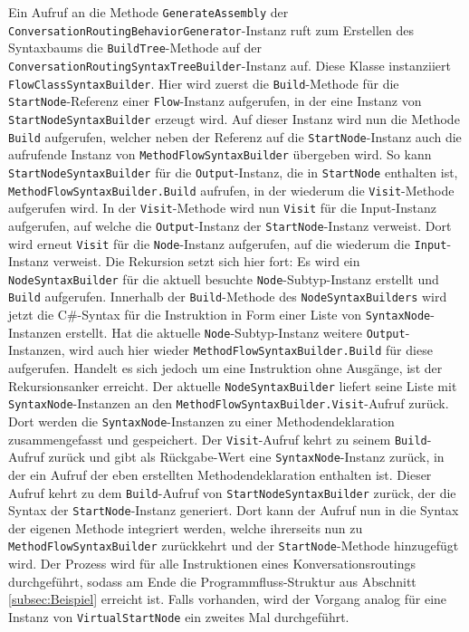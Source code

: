 \noindent Ein Aufruf an die Methode \texttt{GenerateAssembly} der \texttt{Con\-ver\-sa\-tion\-Rou\-ting\-Be\-ha\-vior\-Gen\-era\-tor}-Instanz ruft zum Erstellen des Syntaxbaums die \texttt{Build\-Tree}-Methode auf der \texttt{Con\-ver\-sa\-tion\-Rou\-ting\-Syn\-tax\-Tree\-Buil\-der}-Instanz auf. Diese Klasse instanziiert \texttt{Flow\-Class\-Syn\-tax\-Buil\-der}. Hier wird zuerst die \texttt{Build}-Methode für die \texttt{StartNode}-Referenz einer \texttt{Flow}-Instanz aufgerufen, in der eine Instanz von \texttt{StartNodeSyntaxBuilder} erzeugt wird. Auf dieser Instanz wird nun die Methode \texttt{Build} aufgerufen, welcher neben der Referenz auf die \texttt{StartNode}-Instanz auch die aufrufende Instanz von \texttt{Meth\-od\-Flow\-Syn\-tax\-Buil\-der} übergeben wird. So kann \texttt{StartNodeSyntaxBuilder} für die \texttt{Output}-Instanz, die in \texttt{StartNode} enthalten ist, \texttt{MethodFlowSyntaxBuilder.Build} aufrufen, in der wiederum die \texttt{Visit}-Methode aufgerufen wird. In der \texttt{Visit}-Methode wird nun \texttt{Visit} für die Input-Instanz aufgerufen, auf welche die \texttt{Output}-Instanz der \texttt{Start\-Node}-Instanz verweist. Dort wird erneut \texttt{Visit} für die \texttt{Node}-Instanz aufgerufen, auf die wiederum die \texttt{Input}-Instanz verweist. Die Rekursion setzt sich hier fort: Es wird ein \texttt{NodeSyntaxBuilder} für die aktuell besuchte \texttt{Node}-Subtyp-Instanz erstellt und \texttt{Build} aufgerufen. Innerhalb der \texttt{Build}-Methode des \texttt{NodeSyntaxBuilders} wird jetzt die C\#-Syntax für die Instruktion in Form einer Liste von \texttt{SyntaxNode}-Instanzen erstellt. Hat die aktuelle \texttt{Node}-Subtyp-Instanz weitere \texttt{Output}-Instanzen, wird auch hier wieder \texttt{Meth\-od\-Flow\-Syn\-tax\-Buil\-der.Build} für diese aufgerufen. Handelt es sich jedoch um eine Instruktion ohne Ausgänge, ist der Rekursionsanker erreicht. Der aktuelle \texttt{NodeSyntaxBuilder} liefert seine Liste mit \texttt{SyntaxNode}-Instanzen an den \texttt{Meth\-od\-Flow\-Syn\-tax\-Buil\-der.Visit}-Aufruf zurück. Dort werden die \texttt{SyntaxNode}-Instanzen zu einer Methodendeklaration zusammengefasst und gespeichert. Der \texttt{Visit}-Aufruf kehrt zu seinem \texttt{Build}-Aufruf zurück und gibt als Rückgabe-Wert eine \texttt{SyntaxNode}-Instanz zurück, in der ein Aufruf der eben erstellten Methodendeklaration enthalten ist. Dieser Aufruf kehrt zu dem \texttt{Build}-Aufruf von \texttt{StartNodeSyntaxBuilder} zurück, der die Syntax der \texttt{StartNode}-Instanz generiert. Dort kann der Aufruf nun in die Syntax der eigenen Methode integriert werden, welche ihrerseits nun zu \texttt{Me\-thod\-Flow\-Syn\-tax\-Builder} zurückkehrt und der \texttt{StartNode}-Methode hinzugefügt wird. Der Prozess wird für alle Instruktionen eines Konversationsroutings durchgeführt, sodass am Ende die Programmfluss-Struktur aus Abschnitt \ref{subsec:Beispiel} erreicht ist. Falls vorhanden, wird der Vorgang analog für eine Instanz von \texttt{VirtualStartNode} ein zweites Mal durchgeführt.
